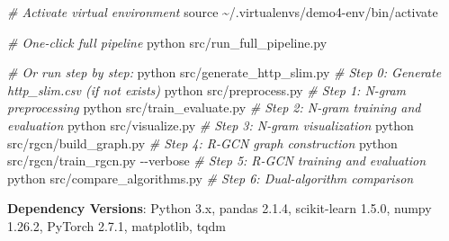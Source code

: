 \documentclass[
  a4paper,
  11pt]{article}
\newenvironment{Shaded}{}{}
\newcommand{\AttributeTok}[1]{\textcolor[rgb]{0.49,0.56,0.16}{#1}}
\newcommand{\BuiltInTok}[1]{\textcolor[rgb]{0.00,0.50,0.00}{#1}}
\newcommand{\CommentTok}[1]{\textcolor[rgb]{0.38,0.63,0.69}{\textit{#1}}}
\newcommand{\ExtensionTok}[1]{#1}
\newcommand{\NormalTok}[1]{#1}
\begin{document}
\begin{Shaded}
\begin{Highlighting}[]
\CommentTok{\# Activate virtual environment}
\BuiltInTok{source}\NormalTok{ \textasciitilde{}/.virtualenvs/demo4{-}env/bin/activate}

\CommentTok{\# One{-}click full pipeline}
\ExtensionTok{python}\NormalTok{ src/run\_full\_pipeline.py}

\CommentTok{\# Or run step by step:}
\ExtensionTok{python}\NormalTok{ src/generate\_http\_slim.py         }\CommentTok{\# Step 0: Generate http\_slim.csv (if not exists)}
\ExtensionTok{python}\NormalTok{ src/preprocess.py                  }\CommentTok{\# Step 1: N{-}gram preprocessing}
\ExtensionTok{python}\NormalTok{ src/train\_evaluate.py              }\CommentTok{\# Step 2: N{-}gram training and evaluation}
\ExtensionTok{python}\NormalTok{ src/visualize.py                   }\CommentTok{\# Step 3: N{-}gram visualization}
\ExtensionTok{python}\NormalTok{ src/rgcn/build\_graph.py            }\CommentTok{\# Step 4: R{-}GCN graph construction}
\ExtensionTok{python}\NormalTok{ src/rgcn/train\_rgcn.py }\AttributeTok{{-}{-}verbose}   \CommentTok{\# Step 5: R{-}GCN training and evaluation}
\ExtensionTok{python}\NormalTok{ src/compare\_algorithms.py          }\CommentTok{\# Step 6: Dual{-}algorithm comparison}
\end{Highlighting}
\end{Shaded}

\textbf{Dependency Versions}: Python 3.x, pandas 2.1.4, scikit-learn
1.5.0, numpy 1.26.2, PyTorch 2.7.1, matplotlib, tqdm
\end{document}
